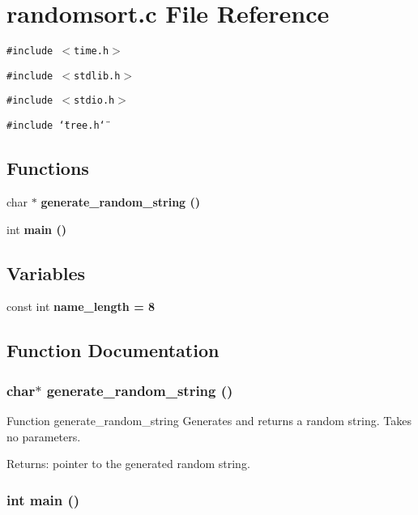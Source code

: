 \section{randomsort.c File Reference}
\label{randomsort_8c}
{\tt \#include $<$time.h$>$}\par
{\tt \#include $<$stdlib.h$>$}\par
{\tt \#include $<$stdio.h$>$}\par
{\tt \#include \char`\"{}tree.h\char`\"{}}\par
\subsection*{Functions}
\begin{CompactItemize}
\item 
char $\ast$ \bf{generate\_\-random\_\-string} ()
\item 
int \bf{main} ()
\end{CompactItemize}
\subsection*{Variables}
\begin{CompactItemize}
\item 
const int \bf{name\_\-length} = 8
\end{CompactItemize}


\subsection{Function Documentation}
\subsubsection{\setlength{\rightskip}{0pt plus 5cm}char$\ast$ generate\_\-random\_\-string ()}\label{randomsort_8c_868d130585077b8c5c233a76cf38bead}


Function generate\_\-random\_\-string Generates and returns a random string. Takes no parameters. \begin{Desc}
\item[Returns:]pointer to the generated random string. \end{Desc}
\subsubsection{\setlength{\rightskip}{0pt plus 5cm}int main ()}\label{randomsort_8c_446c6b9a1a4dbab517fbb760870458a3}


